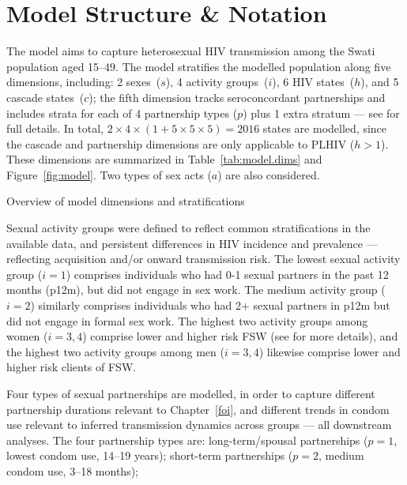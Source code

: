 \section{Model Structure \& Notation}\label{model.str}
The model aims to capture heterosexual HIV transmission among the Swati population aged 15--49.
The model stratifies the modelled population along five dimensions, including:
2 sexes~($s$), 4 activity groups~($i$), 6 HIV states~($h$), and 5 cascade states~($c$);
the fifth dimension tracks seroconcordant \hivp partnerships
and includes strata for each of 4 partnership types ($p$) plus 1 extra stratum
--- see  for full details.
In total, $2 \times 4 \times (1 + 5 \times 5 \times 5) = 2016$ states are modelled,
since the cascade and partnership dimensions are only applicable to PLHIV ($h>1$).
These dimensions are summarized in Table~\ref{tab:model.dims} and Figure~\ref{fig:model}.
Two types of sex acts ($a$) are also considered.
\begin{table}
  \centering
  \caption{Overview of model dimensions and stratifications}
  \label{tab:model.dims}
  
\end{table}
\par
Sexual activity groups were defined to reflect common stratifications in the available data,
and persistent differences in HIV incidence and prevalence
\cite{SDHS2006,Bicego2013,Justman2016,SHIMS2}
--- reflecting acquisition and/or onward transmission risk.
The lowest sexual activity group ($i=1$) comprises
individuals who had 0-1 sexual partners in the past 12 months (p12m),
but did not engage in sex work.
The medium activity group ($i=2$) similarly comprises
individuals who had 2+ sexual partners in p12m
but did not engage in formal sex work.
The highest two activity groups among women ($i=3,4$) comprise
lower and higher risk FSW (see  for more details), and
the highest two activity groups among men ($i=3,4$) likewise comprise
lower and higher risk clients of FSW.
\par
Four types of sexual partnerships are modelled,
in order to capture different partnership durations relevant to Chapter~\ref{foi},
and different trends in condom use relevant to inferred transmission dynamics across groups
--- \ie all downstream analyses.
The four partnership types are:
long-term/spousal partnerships ($p=1$, lowest condom use, 14--19 years);
short-term partnerships ($p=2$, medium condom use, 3--18 months);
